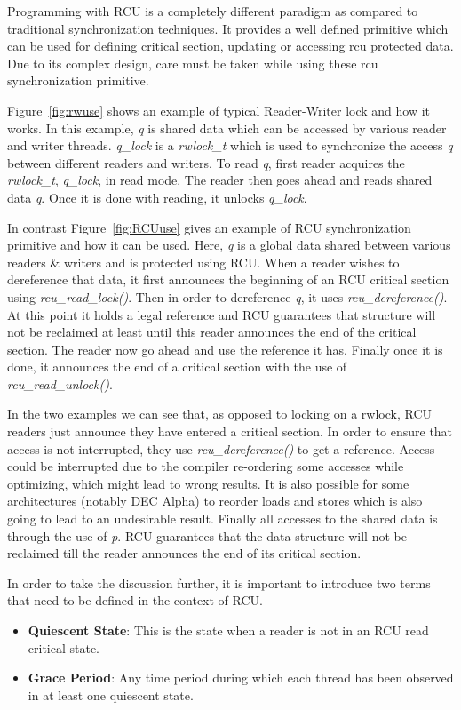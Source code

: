 Programming with RCU is a completely different paradigm as compared to traditional synchronization techniques. It provides a well defined primitive which can be used for defining critical section, updating or accessing rcu protected data. Due to its complex design, care must be taken while using these rcu synchronization primitive.


Figure~\ref{fig:rwuse} shows an example of typical Reader-Writer lock and how it works. In this example, \emph{q} is shared data which can be accessed by various reader and writer threads. \emph{q\_lock} is a \emph{rwlock\_t} which is used to synchronize the access \emph{q} between different readers and writers. To read \emph{q}, first reader acquires the \emph{rwlock\_t}, \emph{q\_lock}, in read mode. The reader then goes ahead and reads shared data \emph{q}. Once it is done with reading, it unlocks \emph{q\_lock}.

In contrast Figure~\ref{fig:RCUuse} gives an example of RCU synchronization primitive and how it can be used. Here, \emph{q} is a global data shared between various readers \& writers and is protected using RCU. When a reader wishes to dereference that data, it first announces the beginning of an RCU critical section using \emph{rcu\_read\_lock()}. Then in order to dereference \emph{q}, it uses \emph{rcu\_dereference()}. At this point it holds a legal reference and RCU guarantees that structure will not be reclaimed at least until this reader announces the end of the critical section. The reader now go ahead and use the reference it has. Finally once it is done, it announces the end of a critical section with the use of \emph{rcu\_read\_unlock()}.

In the two examples we can see that, as opposed to locking on a rwlock, RCU readers just announce they have entered a critical section. In order to ensure that access is not
interrupted, they use \emph{rcu\_dereference()} to get a reference. Access could be interrupted due to the compiler re-ordering some accesses while optimizing, which might lead
to wrong results. It is also possible for some architectures (notably DEC Alpha) to reorder loads and stores which is also going to lead to an undesirable result. Finally all accesses to the shared data is through the use of \emph{p}. RCU guarantees that the data structure
will not be reclaimed till the reader announces the end of its critical section.

In order to take the discussion further, it is important to introduce two terms that need to be defined in the context of RCU.
\begin{itemize}
\item{\bf Quiescent State}: This is the state when a reader is not in an RCU read critical state.
\item{\bf Grace Period}: Any time period during which each thread has been observed in at least one quiescent state.
\end{itemize}


